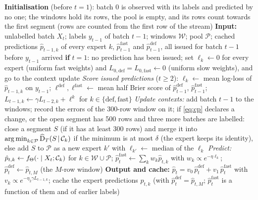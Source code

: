 \documentclass[11pt]{article}
\theoremstyle{plain}
\theoremstyle{definition}
\theoremstyle{remark}
\newcommand{\method}{\textsc{MICE}}   %
\begin{document}
\begin{algorithm}[tb]
\caption{\method{} for one batch $t\ge1$}\label{alg:mice}
\begin{algorithmic}[1]
\STATE \textbf{Initialisation} (before $t=1$): batch 0 is observed with its labels and predicted by no one; the windows
       hold its rows, the pool is empty, and its rows count towards the first segment
       (rows are counted from the first row of the stream)
\STATE \textbf{Input:} unlabelled batch $X_t$; labels $y_{t-1}$ of batch $t-1$; windows $\mathcal W$; pool $\mathcal P$;
       cached predictions $\hat p_{t-1,k}$ of every expert $k$, $\hat p^{\mathrm{fast}}_{t-1}$ and
       $\hat p^{\mathrm{def}}_{t-1}$, all issued for batch $t-1$ before $y_{t-1}$ arrived
\STATE \textbf{if} $t=1$: no prediction has been issued; set $\ell_k\leftarrow0$ for every expert (uniform fast
       weights) and $L_{0,\mathrm{def}}=L_{0,\mathrm{fast}}\leftarrow0$ (uniform slow weights), and go to the context
       update
\STATE \emph{Score issued predictions} ($t\ge2$): $\ell_k\leftarrow$ mean log-loss of $\hat p_{t-1,k}$ on $y_{t-1}$;
       $\ell^{\mathrm{def}},\ell^{\mathrm{fast}}\leftarrow$ mean half Brier score of $\hat p^{\mathrm{def}}_{t-1}$,
       $\hat p^{\mathrm{fast}}_{t-1}$; $L_{t-1,k}\leftarrow\gamma L_{t-2,k}+\ell^{k}$ for $k\in\{\mathrm{def},\mathrm{fast}\}$
\STATE \emph{Update contexts:} add batch $t-1$ to the windows; record the errors of the 300-row window on it; if
       \eqref{eq:cp} declares a change, or the open segment has 500 rows and three more batches are labelled: close a
       segment $S$ (if it has at least 300 rows) and merge
       it into $\operatorname*{arg\,min}_{k\in\mathcal P}\widehat{\mathrm{D}}_T(S\,|\,\mathcal{C}_k)$ if the minimum is at most $\delta$ (the expert
       keeps its identity), else add $S$ to $\mathcal P$ as a new expert $k'$ with $\ell_{k'}\leftarrow$ median of
       the $\ell_k$
\STATE \emph{Predict:} $\hat p_{t,k}\leftarrow f_\Theta(\cdot\mid X_t;\mathcal{C}_k)$ for $k\in\mathcal W\cup\mathcal P$;
       $\hat p^{\mathrm{fast}}_t\leftarrow\sum_k w_k\hat p_{t,k}$ with $w_k\propto e^{-\eta\ell_k}$;
       $\hat p^{\mathrm{def}}_t\leftarrow\hat p_{t,M}$ (the $M$-row window)
\STATE \textbf{Output and cache:} $\hat p_t=v_0\,\hat p^{\mathrm{def}}_t+v_1\,\hat p^{\mathrm{fast}}_t$ with
       $v_k\propto e^{-\eta_2\gamma L_{t-1,k}}$; cache the expert predictions $\hat p_{t,k}$ (with
       $\hat p^{\mathrm{def}}_t=\hat p_{t,M}$; $\hat p^{\mathrm{fast}}_t$ is a function of them and of earlier labels)
\end{algorithmic}
\end{algorithm}
\end{document}
